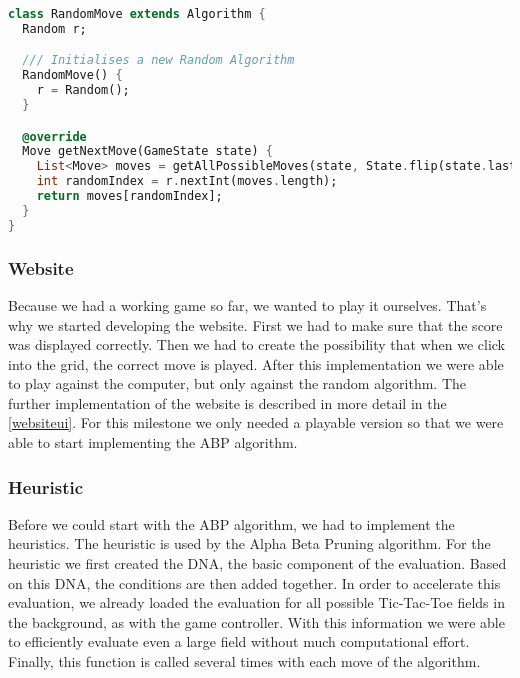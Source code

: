 \begin{lstlisting}[language=Dart,caption={Implementation of the \texttt{RandomMove}}]
class RandomMove extends Algorithm {
  Random r;

  /// Initialises a new Random Algorithm
  RandomMove() {
    r = Random();
  }

  @override
  Move getNextMove(GameState state) {
    List<Move> moves = getAllPossibleMoves(state, State.flip(state.lastMove.state));
    int randomIndex = r.nextInt(moves.length);
    return moves[randomIndex];
  }
}
\end{lstlisting}

\subsubsection{Website}
Because we had a working game so far, we wanted to play it ourselves. That's why we started developing the website. First we had to make sure that the score was displayed correctly. Then we had to create the possibility that when we click into the grid, the correct move is played. After this implementation we were able to play against the computer, but only against the random algorithm. The further implementation of the website is described in more detail in the \autoref{websiteui}. For this milestone we only needed a playable version so that we were able to start implementing the \ac{ABP} algorithm.

\subsubsection{Heuristic}
Before we could start with the \ac{ABP} algorithm, we had to implement the heuristics. The heuristic is used by the Alpha Beta Pruning algorithm. For the heuristic we first created the DNA, the basic component of the evaluation. Based on this DNA, the conditions are then added together. In order to accelerate this evaluation, we already loaded the evaluation for all possible Tic-Tac-Toe fields in the background, as with the game controller. With this information we were able to efficiently evaluate even a large field without much computational effort. 
Finally, this function is called several times with each move of the algorithm.

